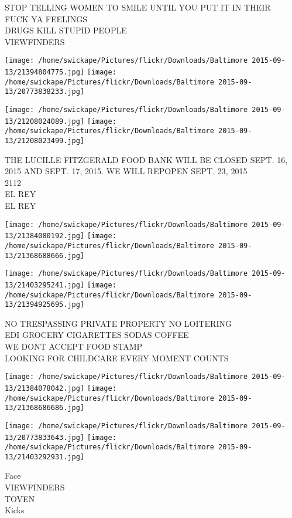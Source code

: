 \documentclass[10pt,letterpaper]{article}
\begin{document}
STOP TELLING WOMEN TO SMILE UNTIL YOU PUT IT IN THEIR\\
FUCK YA FEELINGS\\
DRUGS KILL STUPID PEOPLE\\
VIEWFINDERS
\pagebreak

\texttt{[image: /home/swickape/Pictures/flickr/Downloads/Baltimore 2015-09-13/21394804775.jpg]}
\texttt{[image: /home/swickape/Pictures/flickr/Downloads/Baltimore 2015-09-13/20773838233.jpg]}

\texttt{[image: /home/swickape/Pictures/flickr/Downloads/Baltimore 2015-09-13/21208024089.jpg]}
\texttt{[image: /home/swickape/Pictures/flickr/Downloads/Baltimore 2015-09-13/21208023499.jpg]}

THE LUCILLE FITZGERALD FOOD BANK WILL BE CLOSED SEPT. 16, 2015 AND SEPT. 17, 2015.  WE WILL REPOPEN SEPT. 23, 2015\\
2112\\
EL REY\\
EL REY
\pagebreak

\texttt{[image: /home/swickape/Pictures/flickr/Downloads/Baltimore 2015-09-13/21384080192.jpg]}
\texttt{[image: /home/swickape/Pictures/flickr/Downloads/Baltimore 2015-09-13/21368688666.jpg]}

\texttt{[image: /home/swickape/Pictures/flickr/Downloads/Baltimore 2015-09-13/21403295241.jpg]}
\texttt{[image: /home/swickape/Pictures/flickr/Downloads/Baltimore 2015-09-13/21394925695.jpg]}

NO TRESPASSING PRIVATE PROPERTY NO LOITERING\\
EDI GROCERY CIGARETTES SODAS COFFEE\\
WE DONT ACCEPT FOOD STAMP\\
LOOKING FOR CHILDCARE EVERY MOMENT COUNTS
\pagebreak

\texttt{[image: /home/swickape/Pictures/flickr/Downloads/Baltimore 2015-09-13/21384078042.jpg]}
\texttt{[image: /home/swickape/Pictures/flickr/Downloads/Baltimore 2015-09-13/21368686686.jpg]}

\texttt{[image: /home/swickape/Pictures/flickr/Downloads/Baltimore 2015-09-13/20773833643.jpg]}
\texttt{[image: /home/swickape/Pictures/flickr/Downloads/Baltimore 2015-09-13/21403292931.jpg]}

Face\\
VIEWFINDERS\\
TOVEN\\
Kicks
\pagebreak
\end{document}
